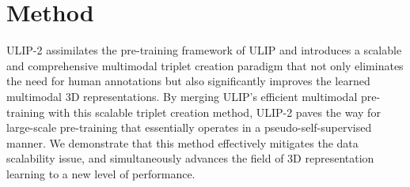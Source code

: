 \documentclass[10pt,twocolumn,letterpaper]{article}
\begin{document}




\section{Method}



ULIP-2 assimilates the pre-training framework of ULIP and introduces a scalable and comprehensive multimodal triplet creation paradigm that not only eliminates the need for human annotations but also significantly improves the learned multimodal 3D representations. By merging ULIP’s efficient multimodal pre-training with this scalable triplet creation method, ULIP-2 paves the way for large-scale pre-training that essentially operates in a pseudo-self-supervised manner. We demonstrate that this method effectively mitigates the data scalability issue, and simultaneously advances the field of 3D representation learning to a new level of performance.
\end{document}
